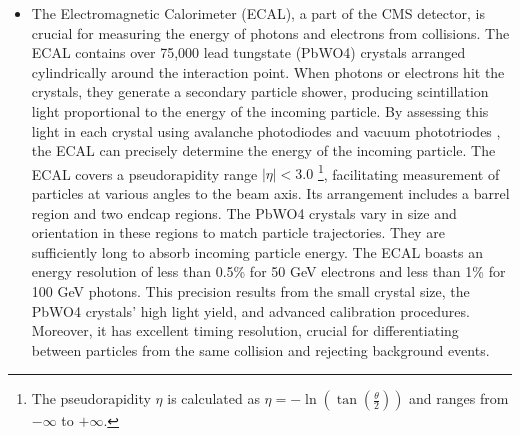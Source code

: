 \begin{itemize}
\item The Electromagnetic Calorimeter (ECAL), a part of the CMS detector, is crucial for measuring the energy of photons and electrons from collisions. The ECAL contains over 75,000 lead tungstate (PbWO4) crystals arranged cylindrically around the interaction point. When photons or electrons hit the crystals, they generate a secondary particle shower, producing scintillation light proportional to the energy of the incoming particle. By assessing this light in each crystal using avalanche photodiodes and vacuum phototriodes \cite{Hobson:2008zz}, the ECAL can precisely determine the energy of the incoming particle. The ECAL covers a pseudorapidity range $|\eta| < 3.0$ \footnote{The pseudorapidity $\eta$ is calculated as $\eta = - \ln(\tan(\frac{\theta}{2}))$ and ranges from $-\infty$ to $+\infty$.}, facilitating measurement of particles at various angles to the beam axis. Its arrangement includes a barrel region and two endcap regions. The PbWO4 crystals vary in size and orientation in these regions to match particle trajectories. They are sufficiently long to absorb incoming particle energy. The ECAL boasts an energy resolution of less than 0.5\% for 50 GeV electrons and less than 1\% for 100 GeV photons. This precision results from the small crystal size, the PbWO4 crystals' high light yield, and advanced calibration procedures. Moreover, it has excellent timing resolution, crucial for differentiating between particles from the same collision and rejecting background events.


\end{itemize}
